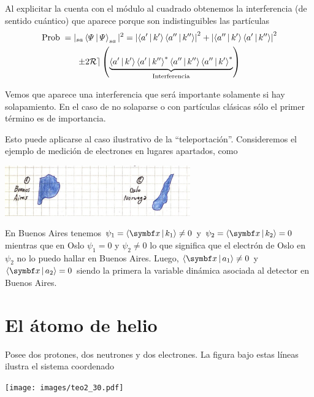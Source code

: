 \documentclass[10pt,oneside]{CBFT_book}
\begin{document}
Al explicitar la cuenta con el módulo al cuadrado obtenemos la interferencia (de sentido cuántico) que
aparece porque son indistinguibles las partículas
\begin{multline*}
	\text{Prob}\; = |_{sa}\Braket{\Psi|\Psi}_{sa}|^2 = \left| \Braket{a'|k'}\Braket{a''|k''} \right|^2 + 
	\left|\Braket{a''|k'}\Braket{a'|k''}\right|^2  \\
	\pm 2\mathcal{Re}\left(\underbrace{ \Braket{a'|k'}\Braket{a'|k''}^*\Braket{a''|k''}\Braket{a''|k'}^* 
	}_\text{Interferencia}\right)
\end{multline*}

Vemos que aparece una interferencia que será importante solamente si hay solapamiento. En el caso de no 
solaparse o con partículas clásicas sólo el primer término es de importancia.

Esto puede aplicarse al caso ilustrativo de la ``teleportación''.
Consideremos el ejemplo de medición de electrones en lugares apartados, como

\includegraphics[width=0.6\textwidth]{images/fig_ft2_extra_identical.jpg}

En Buenos Aires tenemos $\psi_1 = \Braket{\vbx | k_1} \neq 0 $ y $\psi_2 = \Braket{\vbx | k_2} = 0 $
mientras que en Oslo $\psi_1 = 0 $ y $\psi_2 \neq 0 $ lo que significa que el electrón de Oslo en $\psi_2$
no lo puedo hallar en Buenos Aires.
Luego, $\Braket{\vbx|a_1}\neq 0 $ y $\Braket{\vbx|a_2} = 0 $ siendo la primera la variable dinámica asociada
al detector en Buenos Aires.


\section{El átomo de helio}

Posee dos protones, dos neutrones y dos electrones. La figura bajo estas líneas ilustra el sistema
coordenado

\texttt{[image: images/teo2\_30.pdf]}
\end{document}
